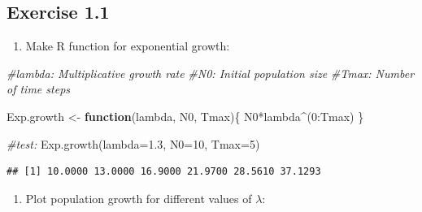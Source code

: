 \documentclass[
]{book}
\newenvironment{Shaded}{\begin{snugshade}}{\end{snugshade}}
\newcommand{\AttributeTok}[1]{\textcolor[rgb]{0.77,0.63,0.00}{#1}}
\newcommand{\CommentTok}[1]{\textcolor[rgb]{0.56,0.35,0.01}{\textit{#1}}}
\newcommand{\ControlFlowTok}[1]{\textcolor[rgb]{0.13,0.29,0.53}{\textbf{#1}}}
\newcommand{\DecValTok}[1]{\textcolor[rgb]{0.00,0.00,0.81}{#1}}
\newcommand{\FloatTok}[1]{\textcolor[rgb]{0.00,0.00,0.81}{#1}}
\newcommand{\FunctionTok}[1]{\textcolor[rgb]{0.00,0.00,0.00}{#1}}
\newcommand{\NormalTok}[1]{#1}
\newcommand{\OtherTok}[1]{\textcolor[rgb]{0.56,0.35,0.01}{#1}}
\newcommand{\SpecialCharTok}[1]{\textcolor[rgb]{0.00,0.00,0.00}{#1}}
\providecommand{\tightlist}{%
  \setlength{\itemsep}{0pt}\setlength{\parskip}{0pt}}
\begin{document}
\hypertarget{exercise-1.1-1}{%
\subsection*{Exercise 1.1}\label{exercise-1.1-1}}

\begin{enumerate}
\def\labelenumi{\arabic{enumi}.}
\tightlist
\item
  Make R function for exponential growth:
\end{enumerate}

\begin{Shaded}
\begin{Highlighting}[]
\CommentTok{\#lambda: Multiplicative growth rate}
\CommentTok{\#N0: Initial population size}
\CommentTok{\#Tmax: Number of time steps}

\NormalTok{Exp.growth }\OtherTok{\textless{}{-}} \ControlFlowTok{function}\NormalTok{(lambda, N0, Tmax)\{}
\NormalTok{        N0}\SpecialCharTok{*}\NormalTok{lambda}\SpecialCharTok{\^{}}\NormalTok{(}\DecValTok{0}\SpecialCharTok{:}\NormalTok{Tmax)}
\NormalTok{\}}

\CommentTok{\#test:}
\FunctionTok{Exp.growth}\NormalTok{(}\AttributeTok{lambda=}\FloatTok{1.3}\NormalTok{, }\AttributeTok{N0=}\DecValTok{10}\NormalTok{, }\AttributeTok{Tmax=}\DecValTok{5}\NormalTok{)        }
\end{Highlighting}
\end{Shaded}

\begin{verbatim}
## [1] 10.0000 13.0000 16.9000 21.9700 28.5610 37.1293
\end{verbatim}

\begin{enumerate}
\def\labelenumi{\arabic{enumi}.}
\setcounter{enumi}{1}
\tightlist
\item
  Plot population growth for different values of \(\lambda\):
\end{enumerate}
\end{document}
